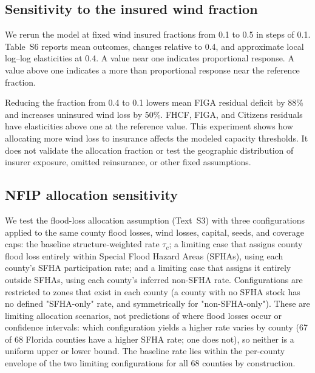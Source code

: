 \subsection*{Sensitivity to the insured wind fraction}
We rerun the model at fixed wind insured fractions from 0.1 to 0.5 in steps of 0.1. Table~S6 reports mean outcomes, changes relative to 0.4, and approximate local log--log elasticities at 0.4. A value near one indicates proportional response. A value above one indicates a more than proportional response near the reference fraction.

Reducing the fraction from 0.4 to 0.1 lowers mean FIGA residual deficit by 88\% and increases uninsured wind loss by 50\%. FHCF, FIGA, and Citizens residuals have elasticities above one at the reference value. This experiment shows how allocating more wind loss to insurance affects the modeled capacity thresholds. It does not validate the allocation fraction or test the geographic distribution of insurer exposure, omitted reinsurance, or other fixed assumptions.

\subsection*{NFIP allocation sensitivity}
We test the flood-loss allocation assumption (Text~S3) with three configurations applied to the same county flood losses, wind losses, capital, seeds, and coverage caps: the baseline structure-weighted rate $\tau_c$; a limiting case that assigns county flood loss entirely within Special Flood Hazard Areas (SFHAs), using each county's SFHA participation rate; and a limiting case that assigns it entirely outside SFHAs, using each county's inferred non-SFHA rate. Configurations are restricted to zones that exist in each county (a county with no SFHA stock has no defined "SFHA-only" rate, and symmetrically for "non-SFHA-only"). These are limiting allocation scenarios, not predictions of where flood losses occur or confidence intervals: which configuration yields a higher rate varies by county (67 of 68 Florida counties have a higher SFHA rate; one does not), so neither is a uniform upper or lower bound. The baseline rate lies within the per-county envelope of the two limiting configurations for all 68 counties by construction.

